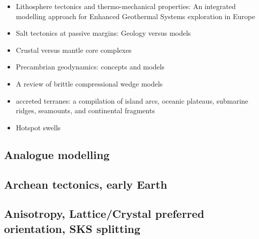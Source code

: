 \begin{itemize}
\item Lithosphere tectonics and thermo-mechanical properties: An integrated modelling
approach for Enhanced Geothermal Systems exploration in Europe \cite{clvz10}
\item Salt tectonics at passive margins: Geology versus models \cite{brfo11}
\item Crustal versus mantle core complexes \cite{brst18}
\item Precambrian geodynamics: concepts and models \cite{gery14}
\item A review of brittle compressional wedge models \cite{buit12}
\item accreted terranes: a compilation of island arcs, oceanic
      plateaus, submarine ridges, seamounts, and continental fragments \cite{tebu14}
\item Hotspot swells \cite{kiad14}
\end{itemize}

\subsection*{Analogue modelling}

\noindent
\cite{daco91}
\cite{nabr93}
\cite{sche00}
\cite{haki01}
\cite{dagl02}
\cite{jujb05}\cite{sche05}
\cite{scbb06}
\cite{clbz08}\cite{fufh08}
\cite{pina09}
\cite{dalt11}
\cite{luws13}
\cite{casw15}\cite{rods15}\cite{kiff15}
\cite{casw17}
\cite{pirf18}
\cite{mocb19}\cite{sccs19}\cite{muwm19}

\subsection*{Archean tectonics, early Earth}

\noindent
\cite{canc19}\cite{gery19}

\subsection*{Anisotropy, Lattice/Crystal preferred orientation, SKS splitting}
  

